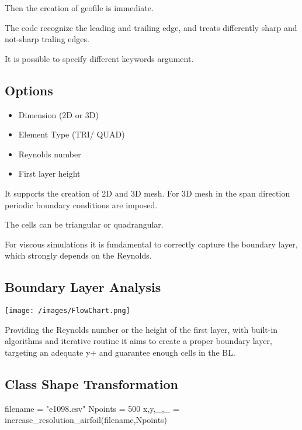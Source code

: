 \documentclass[
  letterpaper,
  DIV=11,
  numbers=noendperiod,
  oneside]{scrartcl}
\newenvironment{Shaded}{\begin{snugshade}}{\end{snugshade}}
\newcommand{\FloatTok}[1]{\textcolor[rgb]{0.68,0.00,0.00}{#1}}
\newcommand{\FunctionTok}[1]{\textcolor[rgb]{0.28,0.35,0.67}{#1}}
\newcommand{\NormalTok}[1]{\textcolor[rgb]{0.00,0.23,0.31}{#1}}
\newcommand{\OperatorTok}[1]{\textcolor[rgb]{0.37,0.37,0.37}{#1}}
\newcommand{\StringTok}[1]{\textcolor[rgb]{0.13,0.47,0.30}{#1}}
\providecommand{\tightlist}{%
  \setlength{\itemsep}{0pt}\setlength{\parskip}{0pt}}\usepackage{longtable,booktabs,array}
\begin{document}
Then the creation of geofile is immediate.

The code recognize the leading and trailing edge, and treats differently
sharp and not-sharp traling edges.

It is possible to specify different keywords argument.

\hypertarget{options}{%
\subsection{Options}\label{options}}

\begin{itemize}
\tightlist
\item
  Dimension (2D or 3D)
\item
  Element Type (TRI/ QUAD)
\item
  Reynolds number
\item
  First layer height
\end{itemize}

It supports the creation of 2D and 3D mesh. For 3D mesh in the span
direction periodic boundary conditions are imposed.

The cells can be triangular or quadrangular.

For viscous simulations it is fundamental to correctly capture the
boundary layer, which strongly depends on the Reynolds.

\hypertarget{boundary-layer-analysis}{%
\subsection{Boundary Layer Analysis}\label{boundary-layer-analysis}}

\texttt{[image: /images/FlowChart.png]}

Providing the Reynolds number or the height of the first layer, with
built-in algorithms and iterative routine it aims to create a proper
boundary layer, targeting an adequate y+ and guarantee enough cells in
the BL.

\hypertarget{class-shape-transformation}{%
\subsection{Class Shape
Transformation}\label{class-shape-transformation}}

\begin{Shaded}
\begin{Highlighting}[]
\NormalTok{filename }\OperatorTok{=} \StringTok{"e1098.csv"}
\NormalTok{Npoints }\OperatorTok{=} \FloatTok{500}
\NormalTok{x,y,\_,\_ }\OperatorTok{=} \FunctionTok{increase\_resolution\_airfoil}\NormalTok{(filename,Npoints)}
\end{Highlighting}
\end{Shaded}
\end{document}
